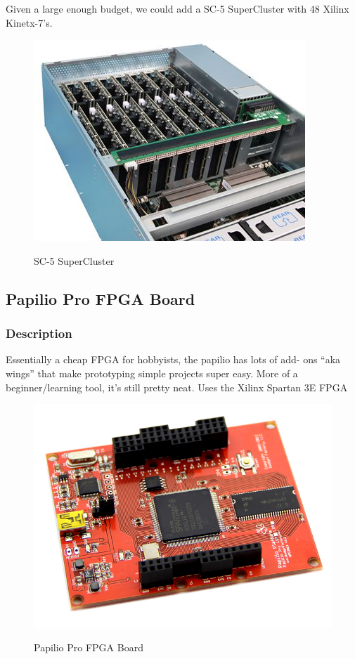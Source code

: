 \documentclass[12pt]{article}
\begin{document}
Given a large enough budget, we could add a SC-5 SuperCluster with 48 Xilinx Kinetx-7's.

\begin{figure}[h!]
  \centering
  \includegraphics[scale=.5]{images/superCluster}
  \label{img:pico}
  \caption{SC-5 SuperCluster}
\end{figure}

\subsection{Papilio Pro FPGA Board}

\subsubsection{Description}
Essentially a cheap FPGA for hobbyists, the papilio has lots of add-
ons “aka wings” that make prototyping simple projects super easy. More of a
beginner/learning tool, it’s still pretty neat. Uses the Xilinx Spartan 3E FPGA

\begin{figure}[h!]
  \centering
  \includegraphics[scale=.5]{images/papilio}
  \label{img:pico}
  \caption{Papilio Pro FPGA Board}
\end{figure}
\end{document}
